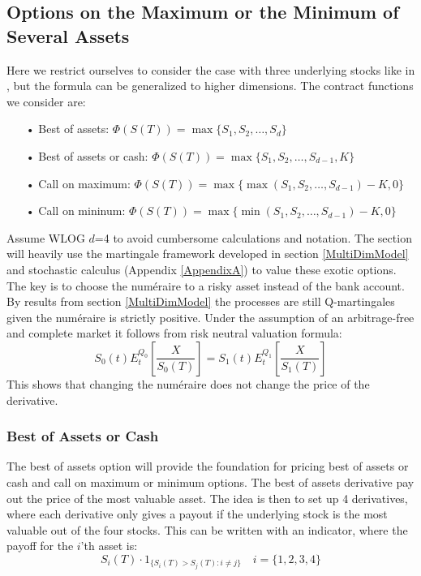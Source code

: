 \subsection{Options on the Maximum or the Minimum of Several Assets}
Here we restrict ourselves to consider the case with three underlying stocks like in \parencite{Ouwehand2006}, but the formula can be generalized to higher dimensions. The contract functions we consider are:
\begin{enumerate}
\item[•] Best of assets: $\Phi(S(T))=\max\{S_1,S_2,\ldots,S_{d}\}$
\item[•] Best of assets or cash: $\Phi(S(T))=\max\{S_1,S_2,\ldots,S_{d-1},K\}$
\item[•] Call on maximum: $\Phi(S(T))=\max\{\max(S_1,S_2,\ldots,S_{d-1})-K,0\}$
\item[•] Call on mininum: $\Phi(S(T))=\max\{\min(S_1,S_2,\ldots,S_{d-1})-K,0\}$
\end{enumerate}
Assume WLOG $d$=4 to avoid cumbersome calculations and notation. The section will heavily use the martingale framework developed in section \ref{MultiDimModel} and stochastic calculus (Appendix \ref{AppendixA}) to value these exotic options. The key is to choose the numéraire to a risky asset instead of the bank account. By results from section \ref{MultiDimModel} the processes are still Q-martingales given the numéraire is strictly positive. Under the assumption of an arbitrage-free and complete market it follows from risk neutral valuation formula:
$$S_0(t)E^{Q_0}_t[\frac{X}{S_0(T)}]=S_1(t)E^{Q_1}_t[\frac{X}{S_1(T)}]$$
This shows that changing the numéraire does not change the price of the derivative.

\subsubsection{Best of Assets or Cash}
The best of assets option will provide the foundation for pricing best of assets or cash and call on maximum or minimum options. The best of assets derivative pay out the price of the most valuable asset. The idea is then to set up 4 derivatives, where each derivative only gives a payout if the underlying stock is the most valuable out of the four stocks. This can be written with an indicator, where the payoff for the $i$'th asset is:
\begin{equation}\label{ithPayoff}
S_i(T) \cdot 1_{\{S_i(T)>S_j(T): i\neq j\}} \quad i=\{1,2,3,4\}
\end{equation}

